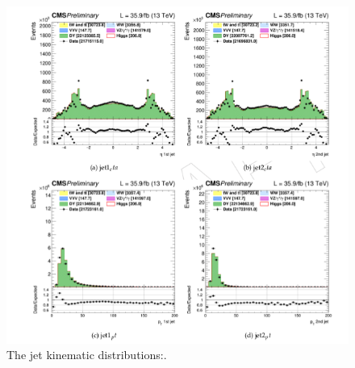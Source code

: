 \begin{figure}
\centering
\includegraphics[scale= 0.5]{../Cap4/jetFig}
\caption{The jet kinematic distributions:.}
\label{jetFig}
\end{figure}

